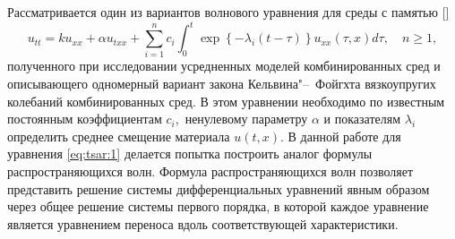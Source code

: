 

\makerutitle

Рассматривается один из вариантов волнового уравнения для среды с памятью []
\begin{equation}
u_{tt}=k u_{xx}+\alpha u_{txx}
+  \sum_{i=1}^{n} c_i \int^t_0 \exp \left\{ -\lambda_i (t-\tau) \right\} u_{xx}(\tau,x)d\tau, \quad n \ge 1,
\label{eq:tsar:1}
\end{equation}
полученного при исследовании усредненных моделей комбинированных сред и описывающего 
одномерный вариант закона Кельвина"--~Фойгхта вязкоупругих колебаний комбинированных сред.
В этом уравнении необходимо по известным постоянным коэффициентам $c_i,$ ненулевому параметру $\alpha$ и показателям $\lambda_i$  определить среднее смещение материала $u(t,x)$. 
В данной работе для уравнения \eqref{eq:tsar:1} делается попытка  построить аналог формулы распространяющихся волн. 
Формула распространяющихся волн позволяет представить решение системы дифференциальных 
уравнений явным образом через общее решение системы первого порядка, в которой каждое уравнение 
является уравнением переноса вдоль соответствующей характеристики.


